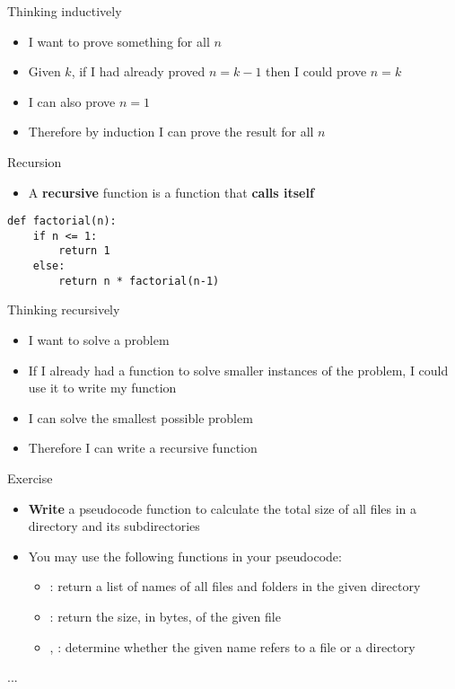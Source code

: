 \begin{frame}{Thinking inductively}
	\begin{itemize}
		\pause\item I want to prove something for all $n$
		\pause\item Given $k$, if I had already proved $n=k-1$ then I could prove $n=k$
		\pause\item I can also prove $n=1$
		\pause\item Therefore by induction I can prove the result for all $n$
	\end{itemize}
\end{frame}

\begin{frame}[fragile]{Recursion}
    \begin{itemize}
        \pause\item A \textbf{recursive} function is a function that \textbf{calls itself}
    \end{itemize}
    \pause
    \begin{lstlisting}
def factorial(n):
    if n <= 1:
        return 1
    else:
        return n * factorial(n-1)
    \end{lstlisting}
\end{frame}

\begin{frame}{Thinking recursively}
	\begin{itemize}
		\pause\item I want to solve a problem
		\pause\item If I already had a function to solve smaller instances of the problem, I could use it
			to write my function
		\pause\item I can solve the smallest possible problem
		\pause\item Therefore I can write a recursive function
	\end{itemize}
\end{frame}

\begin{frame}{Exercise}
	\begin{itemize}
		\item \textbf{Write} a pseudocode function to calculate the total size of all files in a directory and its subdirectories
		\item You may use the following functions in your pseudocode:
			\begin{itemize}
				\item {}: return a list of names of all files and folders in the given directory
				\item {}: return the size, in bytes, of the given file
				\item {}, : determine whether the given name refers to a file or a directory
			\end{itemize}
	\end{itemize}
	\begin{algorithmic}
			\State ... 
		\EndProcedure
	\end{algorithmic}
\end{frame}

